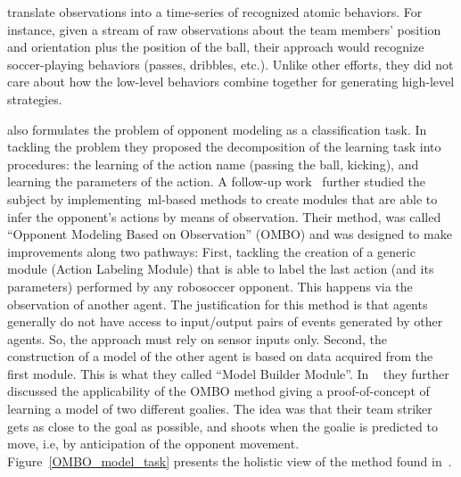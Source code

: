 \cite{kaminka_learning_2003} translate observations into a time-series of recognized atomic behaviors. For instance, given a stream of raw observations about the team members' position and orientation plus the position of the ball, their approach would recognize soccer-playing behaviors (passes, dribbles, etc.). Unlike other efforts, they did not care about how the low-level behaviors combine together for generating high-level strategies.  

\cite{ledezma_predicting_2002} also formulates the problem of opponent modeling as a classification task. In tackling the problem they proposed the decomposition of the learning task into procedures: the learning of the action name (passing the ball, kicking), and learning the parameters of the action. A follow-up work~\citep{ledezma_predicting_2005} further studied the subject by implementing~\gls{ml}-based methods to create modules that are able to infer the opponent's actions by means of observation. Their method, was called ``Opponent Modeling Based on Observation'' (OMBO) and was designed to make improvements along two pathways: First, tackling the creation of a generic module (Action Labeling Module) that is able to label the last action (and its parameters) performed by any robosoccer opponent. This happens via the observation of another agent. The justification for this method is that agents generally do not have access to input/output pairs of events generated by other agents. So, the approach must rely on sensor inputs only. Second, the construction of a model of the other agent is based on data acquired from the first module. This is what they called ``Model Builder Module''. In ~\cite{ledezma_ombo:_2009} they further discussed the applicability of the OMBO method giving a proof-of-concept of learning a model of two different goalies. The idea was that their team striker gets as close to the goal as possible, and shoots when the goalie is predicted to move, i.e, by anticipation of the opponent movement. Figure~\ref{OMBO_model_task} presents the holistic view of the method found in~\cite{ledezma_predicting_2005,ledezma_ombo:_2009}. 

